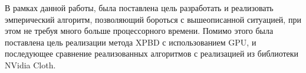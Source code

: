 В рамках данной работы, была поставлена цель разработать и реализовать эмперический алгоритм, позволяющий бороться с вышеописанной ситуацией, при этом не требуя много больше процессорного времени. Помимо этого была поставлена цель реализации метода XPBD с использованием GPU, и последующее сравнение реализованных алгоритмов с реализацией из библиотеки NVidia Cloth.








 

